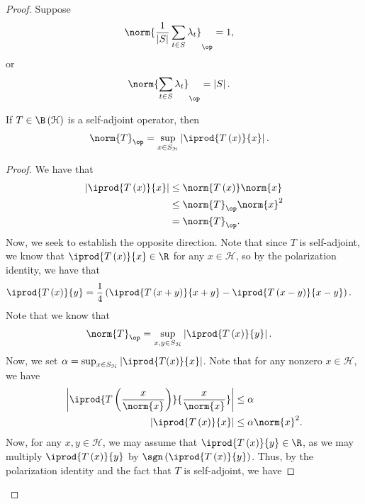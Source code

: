 \documentclass[10pt]{mypackage}
\begin{document}
\begin{proof}
  Suppose
  \begin{align*}
    \norm{\frac{1}{\left\vert S \right\vert}\sum_{t\in S}\lambda_t}_{\op} &= 1,
  \end{align*}
  or
  \begin{align*}
    \norm{\sum_{t\in S}\lambda_t}_{\op} &= \left\vert S \right\vert.
  \end{align*}
  \begin{proposition}
    If $T\in \B\left(\mathcal{H}\right)$ is a self-adjoint operator, then
    \begin{align*}
      \norm{T}_{\op} &= \sup_{x\in S_{\mathcal{H}}} \left\vert \iprod{T\left(x\right)}{x} \right\vert.
    \end{align*}
  \end{proposition}
  \begin{proof}
    We have that
    \begin{align*}
      \left\vert \iprod{T\left(x\right)}{x} \right\vert &\leq \norm{T\left(x\right)}\norm{x}\\
                                                        &\leq \norm{T}_{\op}\norm{x}^2\\
                                                        &= \norm{T}_{\op}.
    \end{align*}
    Now, we seek to establish the opposite direction. Note that since $T$ is self-adjoint, we know that $ \iprod{T\left(x\right)}{x}\in \R $ for any $x\in \mathcal{H}$, so by the polarization identity, we have that
    \begin{align*}
      \iprod{T\left(x\right)}{y} &= \frac{1}{4}\left( \iprod{T\left(x+y\right)}{x+y} - \iprod{T\left(x-y\right)}{x-y}\right).
    \end{align*}
    Note that we know that
    \begin{align*}
      \norm{T}_{\op} &= \sup_{x,y\in S_{\mathcal{H}}}\left\vert \iprod{T\left(x\right)}{y} \right\vert.
    \end{align*}
    Now, we set $\alpha = \sup_{x\in S_{\mathcal{H}}} \left\vert \iprod{T(x)}{x} \right\vert$. Note that for any nonzero $x\in \mathcal{H}$, we have
    \begin{align*}
      \left\vert \iprod{T\left(\frac{x}{\norm{x}}\right)}{\frac{x}{\norm{x}}} \right\vert &\leq \alpha\\
      \left\vert \iprod{T\left(x\right)}{x} \right\vert &\leq \alpha \norm{x}^2.
    \end{align*}
    Now, for any $x,y\in \mathcal{H}$, we may assume that $ \iprod{T\left(x\right)}{y} \in \R $, as we may multiply $ \iprod{T\left(x\right)}{y} $ by $\sgn \left( \iprod{T\left(x\right)}{y}\right)$. Thus, by the polarization identity and the fact that $T$ is self-adjoint, we have

\end{proof}
\end{proof}
\end{document}
